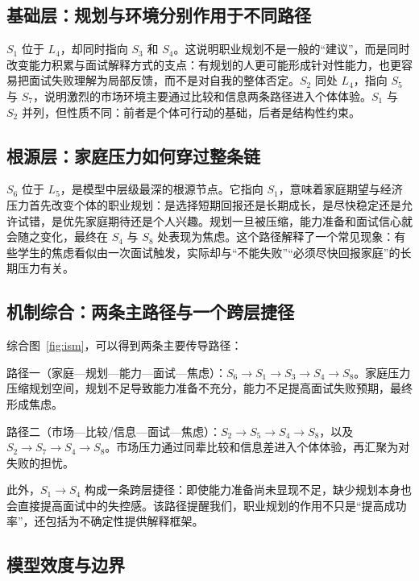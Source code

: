 \documentclass[UTF8,a4paper,zihao=-4]{ctexart}
\newcommand{\factor}[1]{\ensuremath{S_{#1}}}
\newcommand{\lev}[1]{\ensuremath{L_{#1}}}
\begin{document}
\subsection{基础层：规划与环境分别作用于不同路径}

\factor{1} 位于 \lev{4}，却同时指向 \factor{3} 和 \factor{4}。这说明职业规划不是一般的“建议”，而是同时改变能力积累与面试解释方式的支点：有规划的人更可能形成针对性能力，也更容易把面试失败理解为局部反馈，而不是对自我的整体否定。\factor{2} 同处 \lev{4}，指向 \factor{5} 与 \factor{7}，说明激烈的市场环境主要通过比较和信息两条路径进入个体体验。\factor{1} 与 \factor{2} 并列，但性质不同：前者是个体可行动的基础，后者是结构性约束。

\subsection{根源层：家庭压力如何穿过整条链}

\factor{6} 位于 \lev{5}，是模型中层级最深的根源节点。它指向 \factor{1}，意味着家庭期望与经济压力首先改变个体的职业规划：是选择短期回报还是长期成长，是尽快稳定还是允许试错，是优先家庭期待还是个人兴趣。规划一旦被压缩，能力准备和面试信心就会随之变化，最终在 \factor{4} 与 \factor{8} 处表现为焦虑。这个路径解释了一个常见现象：有些学生的焦虑看似由一次面试触发，实际却与“不能失败”“必须尽快回报家庭”的长期压力有关。

\subsection{机制综合：两条主路径与一个跨层捷径}

综合图~\ref{fig:ism}，可以得到两条主要传导路径：

路径一（家庭—规划—能力—面试—焦虑）：\(S_{6}\to S_{1}\to S_{3}\to S_{4}\to S_{8}\)。家庭压力压缩规划空间，规划不足导致能力准备不充分，能力不足提高面试失败预期，最终形成焦虑。

路径二（市场—比较/信息—面试—焦虑）：\(S_{2}\to S_{5}\to S_{4}\to S_{8}\)，以及 \(S_{2}\to S_{7}\to S_{4}\to S_{8}\)。市场压力通过同辈比较和信息差进入个体体验，再汇聚为对失败的担忧。

此外，\(S_{1}\to S_{4}\) 构成一条跨层捷径：即使能力准备尚未显现不足，缺少规划本身也会直接提高面试中的失控感。该路径提醒我们，职业规划的作用不只是“提高成功率”，还包括为不确定性提供解释框架。

\Needspace{48mm}
\subsection{模型效度与边界}
\end{document}
